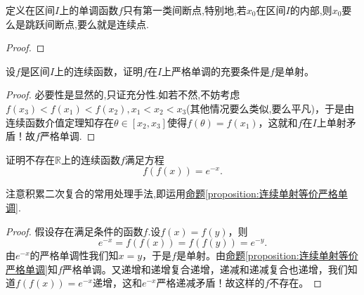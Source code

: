 \documentclass[../../main.tex]{subfiles}
\begin{document}
\begin{proposition}\label{proposition:单调函数只有第一类间断点}
定义在区间$I$上的单调函数$f$只有第一类间断点,特别地,若$x_0$在区间$I$的内部,则$x_0$要么是跳跃间断点,要么就是连续点.
\end{proposition}
\begin{proof}


\end{proof}

\begin{proposition}[连续单射等价严格单调]\label{proposition:连续单射等价严格单调}
设\(f\)是区间\(I\)上的连续函数，证明\(f\)在\(I\)上严格单调的充要条件是\(f\)是单射。
\end{proposition}
\begin{proof}
必要性是显然的,只证充分性.如若不然,不妨考虑\(f(x_3)<f(x_1)<f(x_2),x_1<x_2<x_3\)(其他情况要么类似,要么平凡)，于是由连续函数介值定理知存在\(\theta\in[x_2,x_3]\)使得\(f(\theta)=f(x_1)\)，这就和\(f\)在\(I\)上单射矛盾！故\(f\)严格单调.

\end{proof}

\begin{example}
证明不存在\(\mathbb{R}\)上的连续函数\(f\)满足方程
\[
f(f(x)) = e^{-x}.
\]
\end{example}
\begin{note}
注意积累二次复合的常用处理手法,即运用\hyperref[proposition:连续单射等价严格单调]{命题\ref{proposition:连续单射等价严格单调}}.
\end{note}
\begin{proof}
假设存在满足条件的函数$f$.设\(f(x)=f(y)\)，则
\[
e^{-x}=f(f(x)) = f(f(y)) = e^{-y}.
\]
由\(e^{-x}\)的严格单调性我们知\(x = y\)，于是\(f\)是单射。由\hyperref[proposition:连续单射等价严格单调]{命题\ref{proposition:连续单射等价严格单调}}知\(f\)严格单调。又递增和递增复合递增，递减和递减复合也递增，我们知道\(f(f(x)) = e^{-x}\)递增，这和\(e^{-x}\)严格递减矛盾！故这样的\(f\)不存在。

\end{proof}
\end{document}
